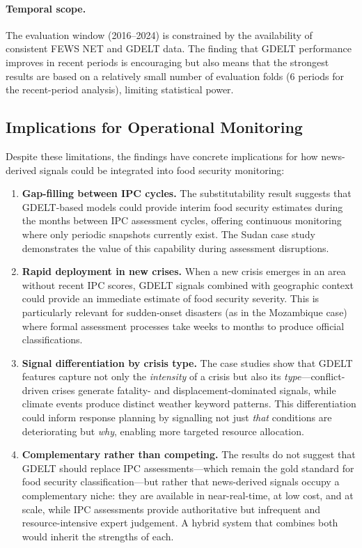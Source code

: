 \documentclass{article}
\begin{document}
\paragraph{Temporal scope.}
The evaluation window (2016--2024) is constrained by the availability of consistent FEWS NET and GDELT data. The finding that GDELT performance improves in recent periods is encouraging but also means that the strongest results are based on a relatively small number of evaluation folds (6 periods for the recent-period analysis), limiting statistical power.

\subsection{Implications for Operational Monitoring}

Despite these limitations, the findings have concrete implications for how news-derived signals could be integrated into food security monitoring:

\begin{enumerate}
    \item \textbf{Gap-filling between IPC cycles.} The substitutability result suggests that GDELT-based models could provide interim food security estimates during the months between IPC assessment cycles, offering continuous monitoring where only periodic snapshots currently exist. The Sudan case study demonstrates the value of this capability during assessment disruptions.

    \item \textbf{Rapid deployment in new crises.} When a new crisis emerges in an area without recent IPC scores, GDELT signals combined with geographic context could provide an immediate estimate of food security severity. This is particularly relevant for sudden-onset disasters (as in the Mozambique case) where formal assessment processes take weeks to months to produce official classifications.

    \item \textbf{Signal differentiation by crisis type.} The case studies show that GDELT features capture not only the \textit{intensity} of a crisis but also its \textit{type}---conflict-driven crises generate fatality- and displacement-dominated signals, while climate events produce distinct weather keyword patterns. This differentiation could inform response planning by signalling not just \textit{that} conditions are deteriorating but \textit{why}, enabling more targeted resource allocation.

    \item \textbf{Complementary rather than competing.} The results do not suggest that GDELT should replace IPC assessments---which remain the gold standard for food security classification---but rather that news-derived signals occupy a complementary niche: they are available in near-real-time, at low cost, and at scale, while IPC assessments provide authoritative but infrequent and resource-intensive expert judgement. A hybrid system that combines both would inherit the strengths of each.
\end{enumerate}
\end{document}
